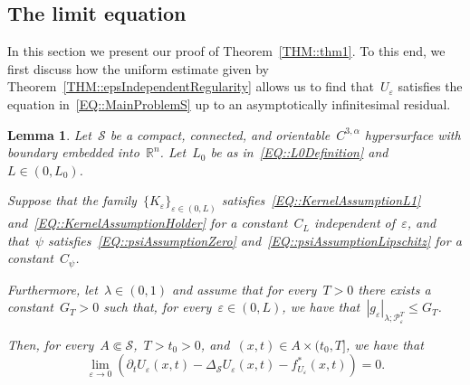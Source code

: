 \documentclass[12pt,a4paper]{amsart}
\numberwithin{equation}{section}
\newtheorem{lemma}[theorem]{Lemma}
\theoremstyle{definition}
\theoremstyle{remark}
\newcommand{\R}{\mathbb{R}}
\newcommand{\eps}{\varepsilon}
\newcommand{\abs}[1]{\left\lvert#1\right\rvert}
\renewcommand{\leq}{\leqslant}
\begin{document}
\subsection{The limit equation}\label{SSEC::LimitEquation}
In this section we present our proof of Theorem~\ref{THM::thm1}. To this end, we first discuss how the uniform estimate given by Theorem~\ref{THM::epsIndependentRegularity} allows us to find that~$U_\eps$ satisfies the equation in~\eqref{EQ::MainProblemS} up to an asymptotically infinitesimal residual.

\begin{lemma}\label{LEM::UepsLimitEquation}
    Let~$\mathcal{S}$ be a compact, connected, and orientable~$C^{3,\alpha}$ hypersurface with boundary embedded into~$\R^n$. Let~$L_0$ be as in~\eqref{EQ::L0Definition} and~$L \in (0,L_0)$.
    
    Suppose that the family~${\{K_\eps\}}_{\eps \in (0,L)}$ satisfies~\eqref{EQ::KernelAssumptionL1} and~\eqref{EQ::KernelAssumptionHolder} for a constant~$C_L$ independent of~$\eps$, and that~$\psi$ satisfies~\eqref{EQ::psiAssumptionZero} and~\eqref{EQ::psiAssumptionLipschitz} for a constant~$C_\psi$.
    
    Furthermore, let~$\lambda \in (0,1)$ and assume that for every~$T>0$ there exists a constant~$G_T > 0$ such that, for every~$\eps \in (0,L)$, we have that~$\abs{g_\eps}_{\lambda; \mathcal{P}_\eps^T} \leq G_T$.
    
    Then, for every~$A \Subset \mathcal{S}$,~$T> t_0 >0$, and~$(x,t) \in A \times (t_0,T]$, we have that%
    \begin{equation}
        \lim_{\eps \to 0} \left(\partial_t U_\eps(x,t) - \Delta_{\mathcal{S}}U_\eps(x,t) - f^\ast_{U_\eps}(x,t)\right) = 0.
    \end{equation}
\end{lemma}
\end{document}
